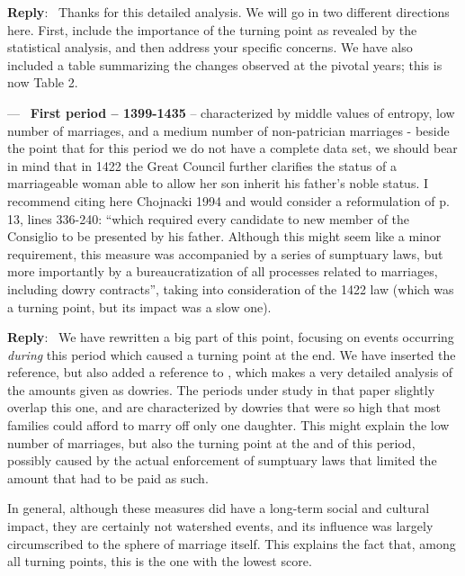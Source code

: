 \documentclass[11pt]{article}
\newcounter{reviewer}
\newcounter{point}[reviewer]
\renewcommand{\thepoint}{P\,\thereviewer.\arabic{point}}
\newenvironment{point}
   {\refstepcounter{point} \bigskip \noindent {\textbf{Reviewer~Point~\thepoint} } ---\ }
   {\par }
\newenvironment{reply}
   {\medskip \noindent \begin{sf}\textbf{Reply}:\  }
   {\medskip \end{sf}}
\begin{document}
\begin{reply}
  Thanks for this detailed analysis. We will go in two different directions
  here. First, include the importance of the turning point as revealed by the
  statistical analysis, and then address your specific concerns. We have also
  included a table summarizing the changes observed at the pivotal years; this
  is now Table 2.
\end{reply}

\begin{point}
  {\bf First period – 1399-1435} – characterized by middle values of entropy,
  low number of marriages, and a medium number of non-patrician marriages -
  beside the point that for this period we do not have a complete data set, we
  should bear in mind that in 1422 the Great Council further clarifies the
  status of a marriageable woman able to allow her son inherit his father’s
  noble status. I recommend citing here Chojnacki 1994 and would consider a
  reformulation of p. 13, lines 336-240: “which required every candidate to new
  member of the Consiglio to be presented by his father. Although this might
  seem like a minor requirement, this measure was accompanied by a series of
  sumptuary laws, but more importantly by a bureaucratization of all processes
  related to marriages, including dowry contracts”, taking into consideration of
  the 1422 law (which was a turning point, but its impact was a slow one).
\end{point}

\begin{reply}
We have rewritten a big part of this point, focusing on events occurring {\em
  during} this period which caused a turning point at the end. We have inserted
the reference, but also added a reference to \cite{10.2307/202860}, which makes
a very detailed analysis of the amounts given as dowries. The periods under
study in that paper slightly overlap this one, and are characterized by dowries
that were so high that most families could afford to marry off only one
daughter. This might explain the low number of marriages, but also the turning
point at the and of this period, possibly caused by the actual enforcement of
sumptuary laws that limited the amount that had to be paid as such.

In general, although these measures did have a long-term social and cultural
impact, they are certainly not watershed events, and its influence was largely
circumscribed to the sphere of marriage itself. This explains the fact that,
among all turning points, this is the one with the lowest score.
\end{reply}
\end{document}
